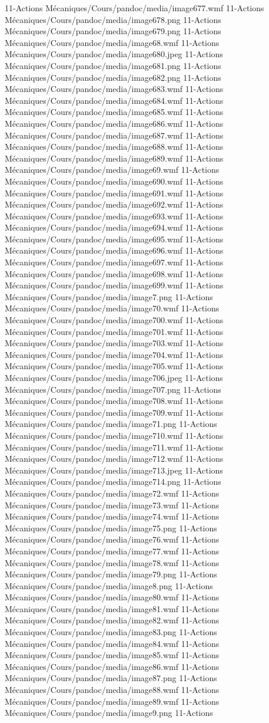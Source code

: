11-Actions Mécaniques/Cours/pandoc/media/image677.wmf 11-Actions Mécaniques/Cours/pandoc/media/image678.png 11-Actions Mécaniques/Cours/pandoc/media/image679.png 11-Actions Mécaniques/Cours/pandoc/media/image68.wmf 11-Actions Mécaniques/Cours/pandoc/media/image680.jpeg 11-Actions Mécaniques/Cours/pandoc/media/image681.png 11-Actions Mécaniques/Cours/pandoc/media/image682.png 11-Actions Mécaniques/Cours/pandoc/media/image683.wmf 11-Actions Mécaniques/Cours/pandoc/media/image684.wmf 11-Actions Mécaniques/Cours/pandoc/media/image685.wmf 11-Actions Mécaniques/Cours/pandoc/media/image686.wmf 11-Actions Mécaniques/Cours/pandoc/media/image687.wmf 11-Actions Mécaniques/Cours/pandoc/media/image688.wmf 11-Actions Mécaniques/Cours/pandoc/media/image689.wmf 11-Actions Mécaniques/Cours/pandoc/media/image69.wmf 11-Actions Mécaniques/Cours/pandoc/media/image690.wmf 11-Actions Mécaniques/Cours/pandoc/media/image691.wmf 11-Actions Mécaniques/Cours/pandoc/media/image692.wmf 11-Actions Mécaniques/Cours/pandoc/media/image693.wmf 11-Actions Mécaniques/Cours/pandoc/media/image694.wmf 11-Actions Mécaniques/Cours/pandoc/media/image695.wmf 11-Actions Mécaniques/Cours/pandoc/media/image696.wmf 11-Actions Mécaniques/Cours/pandoc/media/image697.wmf 11-Actions Mécaniques/Cours/pandoc/media/image698.wmf 11-Actions Mécaniques/Cours/pandoc/media/image699.wmf 11-Actions Mécaniques/Cours/pandoc/media/image7.png 11-Actions Mécaniques/Cours/pandoc/media/image70.wmf 11-Actions Mécaniques/Cours/pandoc/media/image700.wmf 11-Actions Mécaniques/Cours/pandoc/media/image701.wmf 11-Actions Mécaniques/Cours/pandoc/media/image703.wmf 11-Actions Mécaniques/Cours/pandoc/media/image704.wmf 11-Actions Mécaniques/Cours/pandoc/media/image705.wmf 11-Actions Mécaniques/Cours/pandoc/media/image706.jpeg 11-Actions Mécaniques/Cours/pandoc/media/image707.png 11-Actions Mécaniques/Cours/pandoc/media/image708.wmf 11-Actions Mécaniques/Cours/pandoc/media/image709.wmf 11-Actions Mécaniques/Cours/pandoc/media/image71.png 11-Actions Mécaniques/Cours/pandoc/media/image710.wmf 11-Actions Mécaniques/Cours/pandoc/media/image711.wmf 11-Actions Mécaniques/Cours/pandoc/media/image712.wmf 11-Actions Mécaniques/Cours/pandoc/media/image713.jpeg 11-Actions Mécaniques/Cours/pandoc/media/image714.png 11-Actions Mécaniques/Cours/pandoc/media/image72.wmf 11-Actions Mécaniques/Cours/pandoc/media/image73.wmf 11-Actions Mécaniques/Cours/pandoc/media/image74.wmf 11-Actions Mécaniques/Cours/pandoc/media/image75.png 11-Actions Mécaniques/Cours/pandoc/media/image76.wmf 11-Actions Mécaniques/Cours/pandoc/media/image77.wmf 11-Actions Mécaniques/Cours/pandoc/media/image78.wmf 11-Actions Mécaniques/Cours/pandoc/media/image79.png 11-Actions Mécaniques/Cours/pandoc/media/image8.png 11-Actions Mécaniques/Cours/pandoc/media/image80.wmf 11-Actions Mécaniques/Cours/pandoc/media/image81.wmf 11-Actions Mécaniques/Cours/pandoc/media/image82.wmf 11-Actions Mécaniques/Cours/pandoc/media/image83.png 11-Actions Mécaniques/Cours/pandoc/media/image84.wmf 11-Actions Mécaniques/Cours/pandoc/media/image85.wmf 11-Actions Mécaniques/Cours/pandoc/media/image86.wmf 11-Actions Mécaniques/Cours/pandoc/media/image87.png 11-Actions Mécaniques/Cours/pandoc/media/image88.wmf 11-Actions Mécaniques/Cours/pandoc/media/image89.wmf 11-Actions Mécaniques/Cours/pandoc/media/image9.png 11-Actions 
